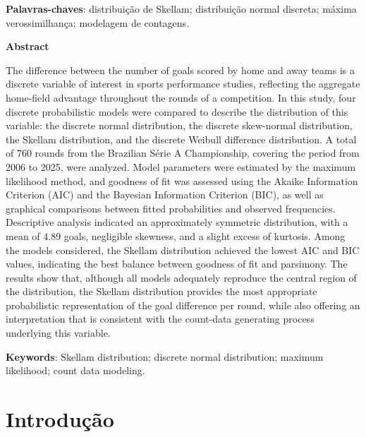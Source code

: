 \documentclass[12pt,a4paper]{article}\usepackage[]{graphicx}\usepackage[]{xcolor}
\begin{document}
\vspace{.4cm}
 
\noindent
\textbf{Palavras-chaves}: distribuição de Skellam; distribuição normal discreta; máxima verossimilhança; modelagem de contagens.
 \vspace{1cm}

\begin{center}
\textbf{Abstract}
\end{center}

\vspace{-.3cm}
The difference between the number of goals scored by home and away teams is a discrete variable of interest in sports performance studies, reflecting the aggregate home-field advantage throughout the rounds of a competition. In this study, four discrete probabilistic models were compared to describe the distribution of this variable: the discrete normal distribution, the discrete skew-normal distribution, the Skellam distribution, and the discrete Weibull difference distribution. A total of 760 rounds from the Brazilian Série A Championship, covering the period from 2006 to 2025, were analyzed. Model parameters were estimated by the maximum likelihood method, and goodness of fit was assessed using the Akaike Information Criterion (AIC) and the Bayesian Information Criterion (BIC), as well as graphical comparisons between fitted probabilities and observed frequencies. Descriptive analysis indicated an approximately symmetric distribution, with a mean of 4.89 goals, negligible skewness, and a slight excess of kurtosis. Among the models considered, the Skellam distribution achieved the lowest AIC and BIC values, indicating the best balance between goodness of fit and parsimony. The results show that, although all models adequately reproduce the central region of the distribution, the Skellam distribution provides the most appropriate probabilistic representation of the goal difference per round, while also offering an interpretation that is consistent with the count-data generating process underlying this variable.

\vspace{.4cm}
 
\noindent \textbf{Keywords}: Skellam distribution; discrete normal distribution; maximum likelihood; count data modeling.

\newpage

\section{Introdução}
\end{document}

